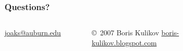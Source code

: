 \begin{frame}
    \frametitle{Questions?}    
    \begin{columns}[c]

        \begin{minipage}[c][\frametextheight][c]{\columnwidth}
        \begin{center}
            {
            \Large
            \href{mailto:joaks@auburn.edu}{joaks@auburn.edu}
            }
        \end{center}
        \end{minipage}


        \begin{minipage}[t][\frametextheight][b]{\columnwidth}
            \begin{figure}
                \begin{center}
                \vspace{-2.0mm}
                \caption{\tiny \copyright~2007 Boris Kulikov \href{http://boris-kulikov.blogspot.com/}{boris-kulikov.blogspot.com}}
                \end{center}
            \end{figure}
        \end{minipage}

    \end{columns}
\end{frame}
